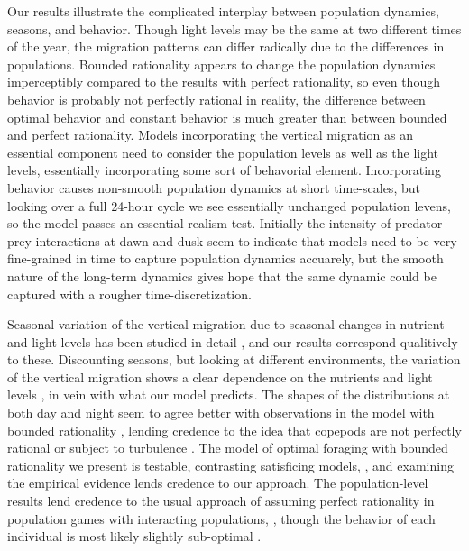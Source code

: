Our results illustrate the complicated interplay between population dynamics, seasons, and behavior. Though light levels may be the same at two different times of the year, the migration patterns can differ radically due to the differences in populations. Bounded rationality appears to change the population dynamics imperceptibly compared to the results with perfect rationality, so even though behavior is probably not perfectly rational in reality, the difference between optimal behavior and constant behavior is much greater than between bounded and perfect rationality. Models incorporating the vertical migration as an essential component need to consider the population levels as well as the light levels, essentially incorporating some sort of behavorial element. Incorporating behavior causes non-smooth population dynamics at short time-scales, but looking over a full 24-hour cycle we see essentially unchanged population levens, so the model passes an essential realism test. Initially the intensity of predator-prey interactions at dawn and dusk seem to indicate that models need to be very fine-grained in time to capture population dynamics accuarely, but the smooth nature of the long-term dynamics gives hope that the same dynamic could be captured with a rougher time-discretization.


Seasonal variation of the vertical migration due to seasonal changes in nutrient and light levels has been studied in detail \citep{wang2014seasonal, beaugrand2001geographical, colebrook1979continuous}, and our results correspond qualitively to these. Discounting seasons, but looking at different environments, the variation of the vertical migration shows a clear dependence on the nutrients and light levels \citep{klevjer2016large}, in vein with what our model predicts. The shapes of the distributions at both day and night seem to agree better with observations in the model with bounded rationality \citep{hay1991zooplankton}, lending credence to the idea that copepods are not perfectly rational or subject to turbulence \citep{visser2001observations}. The model of optimal foraging with bounded rationality we present is testable, contrasting satisficing models,
\citep{nonacs1993satisficing}, and examining the empirical evidence lends credence to our approach. The population-level results lend credence to the usual approach of assuming perfect
rationality in population games with interacting populations, \citep{kvrivan2008ideal}, though the behavior of each individual is most likely slightly sub-optimal
\citep{hurly1999context}.


